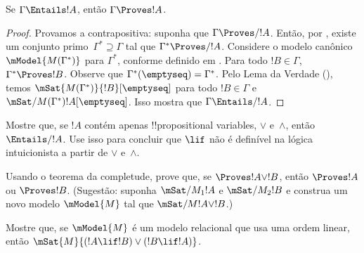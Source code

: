 \documentclass[../../../include/open-logic-section]{subfiles}
\begin{document}


\begin{thm}
  Se $\Gamma \Entails !A$, então $\Gamma \Proves !A$.
\end{thm}

\begin{proof}
  Provamos a contrapositiva: suponha que $\Gamma \Proves/ !A$. Então, por
  , existe um conjunto primo~$\Gamma^*
  \supseteq \Gamma$ tal que $\Gamma^* \Proves/ !A$. Considere o
  modelo canônico~$\mModel{M(\Gamma^*)}$ para $\Gamma^*$, conforme definido em
  . Para todo $!B \in \Gamma$, $\Gamma^*
  \Proves !B$. Observe que $\Gamma^*(\emptyseq) = \Gamma^*$. Pelo Lema da
  Verdade (), temos
  $\mSat{M(\Gamma^*)}{!B}[\emptyseq]$ para todo $!B \in \Gamma$ e
  $\mSat/{M(\Gamma^*)}{!A}[\emptyseq]$. Isso mostra que $\Gamma
  \Entails/ !A$.
\end{proof}

\begin{prob}
  Mostre que, se $!A$ contém apenas !!{propositional variable}s, $\lor$
  e~$\land$, então $\Entails/ !A$. Use isso para concluir que $\lif$ não é
  definível na lógica intuicionista a partir de $\lor$ e~$\land$. 
\end{prob}
  
\begin{prob}
  Usando o teorema da completude, prove que, se $\Proves !A \lor !B$, então
  $\Proves !A$ ou $\Proves !B$. (Sugestão: suponha $\mSat/{M_1}{!A}$ e
  $\mSat/{M_2}{!B}$ e construa um novo modelo $\mModel{M}$ tal que
  $\mSat/{M}{!A \lor !B}$.)
\end{prob}
  
\begin{prob} 
  Mostre que, se $\mModel{M}$ é um modelo relacional que usa uma ordem linear, então
  $\mSat{M}{(!A \lif !B)\lor(!B \lif !A)}$.
\end{prob}
\end{document}
